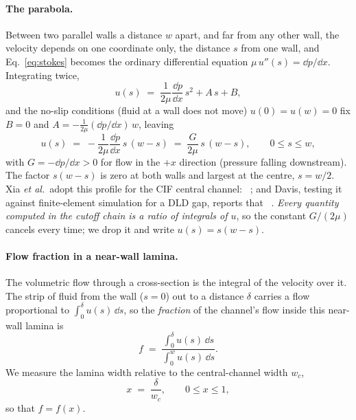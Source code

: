\paragraph{The parabola.} Between two parallel walls a distance $w$ apart, and far from
any other wall, the velocity depends on one coordinate only, the distance $s$ from one wall,
and Eq.~\eqref{eq:stokes} becomes the ordinary differential equation
$\mu\,u''(s)=\dd p/\dd x$. Integrating twice,
\begin{equation}
u(s) \;=\; \frac{1}{2\mu}\frac{\dd p}{\dd x}\,s^2 + A\,s + B,
\end{equation}
and the no-slip conditions (fluid at a wall does not move) $u(0)=u(w)=0$ fix $B=0$ and
$A=-\tfrac{1}{2\mu}(\dd p/\dd x)\,w$, leaving
\begin{equation}
u(s) \;=\; -\frac{1}{2\mu}\frac{\dd p}{\dd x}\,s\,(w-s) \;=\; \frac{G}{2\mu}\, s\,(w - s), \qquad 0 \le s \le w,
\label{eq:parab}
\end{equation}
with $G=-\dd p/\dd x>0$ for flow in the $+x$ direction (pressure falling downstream). The factor
$s(w-s)$ is zero at both walls and largest at the centre, $s=w/2$. Xia \emph{et al.}\ adopt
this profile for the CIF central channel: ~\cite[pp.~9--10]{b2};
and Davis, testing it against finite-element simulation for a DLD gap, reports that
~\cite[p.~18]{b22}.
\emph{Every quantity computed in the cutoff chain is a ratio of integrals of $u$}, so the
constant $G/(2\mu)$ cancels every time; we drop it and write $u(s)=s(w-s)$.

\paragraph{Flow fraction in a near-wall lamina.} The volumetric flow through a
cross-section is the integral of the velocity over it. The strip of fluid from the wall
($s=0$) out to a distance $\delta$ carries a flow proportional to
$\int_0^{\delta}u(s)\,\dd s$, so the \emph{fraction} of the channel's flow inside this
near-wall lamina is
\begin{equation}
f \;=\; \frac{\displaystyle\int_0^{\delta} u(s)\,\dd s}{\displaystyle\int_0^{w} u(s)\,\dd s}.
\label{eq:frac}
\end{equation}
We measure the lamina width relative to the central-channel width $w_c$,
\begin{equation}
x \;=\; \frac{\delta}{w_c}, \qquad 0 \le x \le 1,
\label{eq:xdef}
\end{equation}
so that $f=f(x)$.

